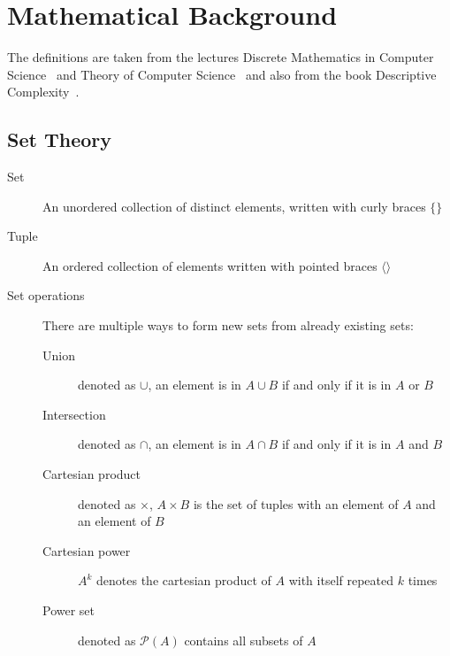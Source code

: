 \chapter{Mathematical Background}\label{ch:mathematical-background}

The definitions are taken from the lectures Discrete Mathematics in Computer Science~\cite{discrete-maths} and Theory of Computer Science~\cite{theory-cs} and also from the book Descriptive Complexity~\cite{descriptive-complexity}.


\section{Set Theory}\label{sec:set-theory}
\begin{description}
    \item[Set] An unordered collection of distinct elements, written with curly braces $\{\}$
    \item[Tuple] An ordered collection of elements written with pointed braces $\langle  \rangle$
    \item[Set operations] There are multiple ways to form new sets from already existing sets:
    \begin{description}
        \item[Union] denoted as $\cup$, an element is in $A \cup B$ if and only if it is in $A$ or $B$
        \item[Intersection] denoted as $\cap$, an element is in $A \cap B$ if and only if it is in $A$ and $B$
        \item[Cartesian product] denoted as $\times$, $A \times B$ is the set of tuples with an element of $A$ and an element of $B$
        \item[Cartesian power] $A^k$ denotes the cartesian product of $A$ with itself repeated $k$ times
        \item[Power set] denoted as $\mathcal{P}(A)$ contains all subsets of $A$
    \end{description}
\end{description}


